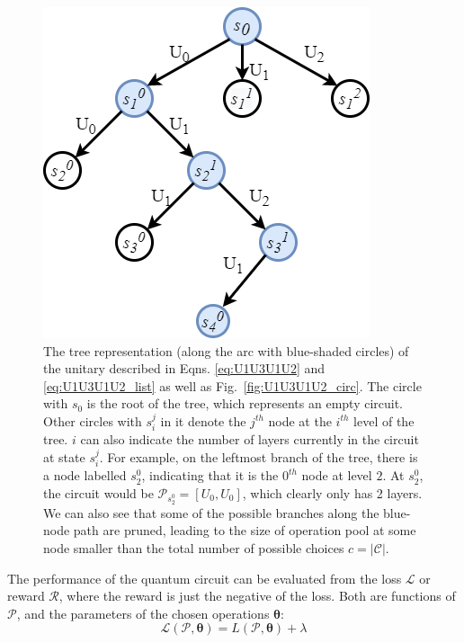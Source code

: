 \documentclass{ieeeaccess}
\begin{document}
  \begin{figure}[H]
    \centering
    \includegraphics[width=0.6\linewidth]{peiyong_fig_2.png}
    \caption{The tree representation (along the arc with blue-shaded circles) of the unitary described in Eqns. \ref{eq:U1U3U1U2} and \ref{eq:U1U3U1U2_list} as well as Fig.~\ref{fig:U1U3U1U2_circ}. The circle with $s_0$ is the root of the tree, which represents an empty circuit. Other circles with $s_i^j$ in it denote the $j^{th}$ node at the $i^{th}$ level of the tree. $i$ can also indicate the number of layers currently in the circuit at state $s_i^j$. For example, on the leftmost branch of the tree, there is a node labelled $s_2^0$, indicating that it is the $0^{th}$ node at level $2$. At $s_2^0$, the circuit would be $\mathcal{P}_{s_2^0}=[U_0, U_0]$, which clearly only has 2 layers. We can also see that some of the possible branches along the blue-node path are pruned, leading to the size of operation pool at some node smaller than the total number of possible choices $c = \vert \mathcal{C}\vert$.}
    \label{fig:treeexample}
  \end{figure}

  The performance of the quantum circuit can be evaluated from the loss $\mathcal{L}$ or reward $\mathcal{R}$, where the reward is just the negative of the loss. Both are functions of $\mathcal{P}$, and the parameters of the chosen operations $\boldsymbol{\theta}$:
  \begin{equation}
      \mathcal{L}(\mathcal{P},\boldsymbol{\theta})=L(\mathcal{P}, \boldsymbol{\theta})+\lambda
  \end{equation}
  
\end{document}
